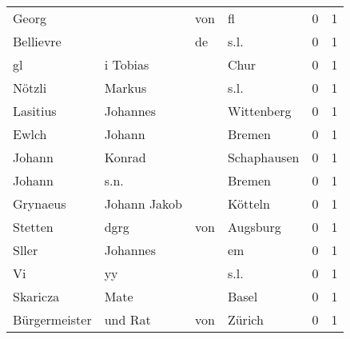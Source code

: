 \begin{center}
\begin{tiny}
\begin{longtabu}{llllrr}
                    Georg &                                    &         von &                                          fl &          0 &         1 \\
                Bellievre &                                    &          de &                                        s.l. &          0 &         1 \\
                       gl &                           i Tobias &             &                                        Chur &          0 &         1 \\
                   Nötzli &                             Markus &             &                                        s.l. &          0 &         1 \\
                 Lasitius &                           Johannes &             &                                  Wittenberg &          0 &         1 \\
                    Ewlch &                             Johann &             &                                      Bremen &          0 &         1 \\
                   Johann &                             Konrad &             &                                 Schaphausen &          0 &         1 \\
                   Johann &                               s.n. &             &                                      Bremen &          0 &         1 \\
                 Grynaeus &                       Johann Jakob &             &                                     Kötteln &          0 &         1 \\
                  Stetten &                               dgrg &         von &                                    Augsburg &          0 &         1 \\
                    Sller &                           Johannes &             &                                          em &          0 &         1 \\
                       Vi &                                 yy &             &                                        s.l. &          0 &         1 \\
                 Skaricza &                               Mate &             &                                       Basel &          0 &         1 \\
            Bürgermeister &                            und Rat &         von &                                      Zürich &          0 &         1 \\

\end{longtabu}
\end{tiny}
\end{center}

